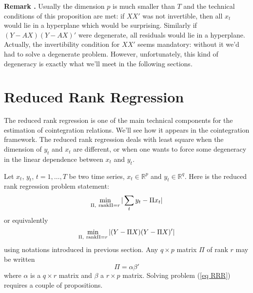\documentclass[12pt, leqno]{article}
\newcommand{\rank}{\text{\rm rank}}
\renewcommand{\det}[1]{|#1|}
\newcommand{\real}{\mathbb{R}}
\newcounter{prop}
\newcounter{ex}
\newcounter{rem}
\renewcommand{\therem}{\arabic{rem}}
\newenvironment{rem}[0]%
{\refstepcounter{rem}\vspace{10pt}\par\noindent 
{\bf Remark \therem.}}%
{\par\vspace{0.2cm}}
\newcounter{prob}
\begin{document}
\begin{rem} Usually the dimension $p$ is much smaller than $T$ and 
the technical conditions of this proposition are met: if $XX'$ was not invertible,
then all $x_t$ would lie in a hyperplane which would be surprising. 
Similarly if $(Y - AX) (Y-AX)'$ were degenerate, all residuals would lie in a hyperplane. 
Actually, the invertibility condition for $X X'$ seems mandatory: without it
we'd had to solve a degenerate problem. However, unfortunately, this kind of degeneracy
is exactly what we'll meet in the following sections. 
\end{rem}

\section{Reduced Rank Regression}
\label{sec RRR}
The reduced rank regression is one of the main technical components for the estimation
of cointegration relations. 
We'll see how it appears in the cointegration framework.
The reduced rank regression deals with least square when the dimension of $y_t$ and $x_t$ are different, 
or when one wants to force some degeneracy in the linear dependence between $x_t$ and $y_t$.

Let $x_t$, $y_t$, $t=1,\ldots, T$ be two time series, $x_t \in \real^p$ and $y_t \in \real^q$.
Here is the reduced rank regression problem statement:
$$
\min_{\Pi,\ \rank \Pi=r} \det{\sum_t y_t - \Pi x_t}
$$
or equivalently
\begin{equation}
\label{eq RRR}
\min_{\Pi,\ \rank \Pi=r} \det{(Y - \Pi X) (Y - \Pi X)'}
\end{equation}
using notations introduced in previous section. Any $q\times p$ matrix $\Pi$
of rank $r$ may be written
$$
\Pi = \alpha \beta'
$$
where $\alpha$ is a $q \times r$ matrix and $\beta$ a $r \times p$ matrix.
Solving problem (\ref{eq RRR}) requires a couple of propositions.
\end{document}
